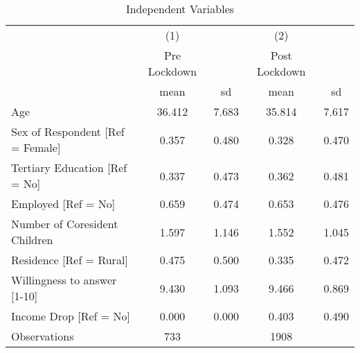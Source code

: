 \begin{table}[htbp]\centering
\def\sym#1{\ifmmode^{#1}\else\(^{#1}\)\fi}
\caption{{Independent Variables}}
\begin{tabular}{l*{2}{cc}}
\hline\hline
                    &\multicolumn{1}{c}{(1)}&            &\multicolumn{1}{c}{(2)}&            \\
                    &Pre Lockdown&            &Post Lockdown&            \\
                    &        mean&          sd&        mean&          sd\\
\hline
Age                 &      36.412&       7.683&      35.814&       7.617\\
Sex of Respondent [Ref = Female]&       0.357&       0.480&       0.328&       0.470\\
Tertiary Education [Ref = No]     &       0.337&       0.473&       0.362&       0.481\\
Employed [Ref = No]   &       0.659&       0.474&       0.653&       0.476\\
Number of Coresident Children&       1.597&       1.146&       1.552&       1.045\\
Residence [Ref = Rural]     &       0.475&       0.500&       0.335&       0.472\\
Willingness to answer [1-10]&       9.430&       1.093&       9.466&       0.869\\
{Income Drop [Ref = No]}&     0.000 &       0.000 &       0.403&       0.490\\
\hline
Observations        &         733&            &        1908&            \\
\hline\hline
\end{tabular}
\end{table}
